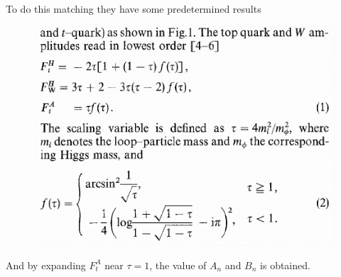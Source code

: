 \documentclass[8pt,dvipsnames,table]{beamer}
\begin{document}
\begin{frame}
	\frametitle{}

	To do this matching they have some predetermined results
	\begin{figure}[!htb]
		\centering
		\includegraphics[width=.8\linewidth]{image16.png}
		\label{fig:image16}
	\end{figure}
	And by expanding $F_t^A$ near $\tau=1$, the value of $A_n$ and $B_n$ is obtained.

\end{frame}
\end{document}
